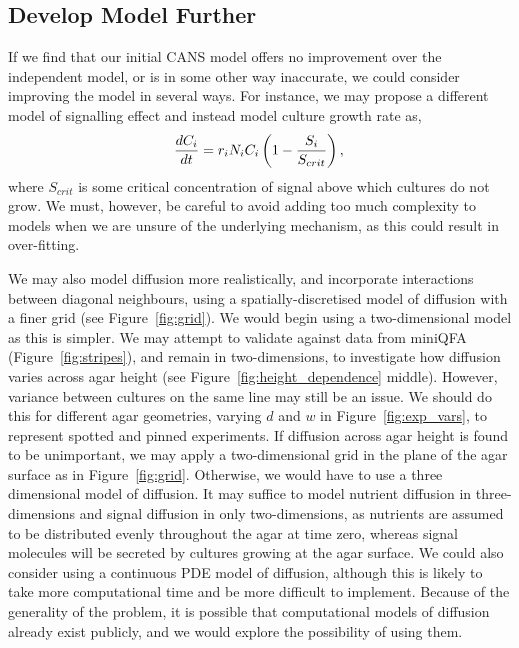 \subsection{Develop Model Further}
\label{sec:dev-mod-further}
If we find that our initial CANS model offers no improvement over the
independent model, or is in some other way inaccurate, we could
consider improving the model in several ways. For instance, we may
propose a different model of signalling effect and instead model
culture growth rate as,
\begin{equation}
  \label{eq:7}
  \frac{dC_{i}}{dt} = r_{i}N_{i}C_{i}\left(1 - \frac{S_{i}}{S_{crit}}\right),\\
\end{equation}
where \(S_{crit}\) is some critical concentration of signal above
which cultures do not grow. We must, however, be careful to avoid
adding too much complexity to models when we are unsure of the
underlying mechanism, as this could result in over-fitting.

We may also model diffusion more realistically, and incorporate
interactions between diagonal neighbours, using a
spatially-discretised model of diffusion with a finer grid (see
Figure~\ref{fig:grid}). We would begin using a two-dimensional model
as this is simpler. We may attempt to validate against data from
miniQFA (Figure~\ref{fig:stripes}), and remain in two-dimensions, to
investigate how diffusion varies across agar height (see
Figure~\ref{fig:height_dependence} middle). However, variance between
cultures on the same line may still be an issue. We should do this for
different agar geometries, varying \(d\) and \(w\) in
Figure~\ref{fig:exp_vars}, to represent spotted and pinned
experiments. If diffusion across agar height is found to be
unimportant, we may apply a two-dimensional grid in the plane of the
agar surface as in Figure~\ref{fig:grid}. Otherwise, we would have to
use a three dimensional model of diffusion. It may suffice to model
nutrient diffusion in three-dimensions and signal diffusion in only
two-dimensions, as nutrients are assumed to be distributed evenly
throughout the agar at time zero, whereas signal molecules will be
secreted by cultures growing at the agar surface. We could also
consider using a continuous PDE model of diffusion, although this is
likely to take more computational time and be more difficult to
implement. Because of the generality of the problem, it is possible
that computational models of diffusion already exist publicly, and we
would explore the possibility of using them.

